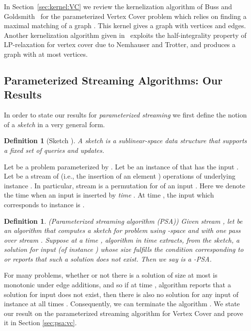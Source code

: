 \documentclass[11pt,letter]{article}
\newtheorem{definition}[theorem]{Definition}
\renewcommand{\paragraph}[1]{\medskip \noindent {\bf #1}}
\begin{document}
In Section~\ref{sec:kernel:VC} we review
the kernelization algorithm of Buss and Goldsmith~\cite{BG93} for the parameterized Vertex Cover problem
which relies on finding a maximal matching of a graph .
This kernel gives a graph with  vertices and  edges.
Another kernelization algorithm given in~\cite{FG06} exploits the half-integrality
property of LP-relaxation for vertex cover due to Nemhauser and Trotter,
and produces a graph with at most  vertices.




\subsection{Parameterized Streaming Algorithms: Our Results}

In order to state our results for \textit{parameterized streaming}
we first define the notion of a \textit{sketch}  in a very general form.


\begin{definition}[Sketch \cite{AMS99,FKSV02,I06JACM}]
\label{def:sketch}
A \it{sketch} is a sublinear-space data structure that supports
a fixed set of queries and updates.
\end{definition}




\paragraph{Insertion-Only Streaming.}
Let   be a problem parameterized by .
Let  be an instance of  that has the input
.
Let  be a stream of  (i.e., the insertion of an element )
operations of underlying instance .
In particular, stream  is a permutation
 for  of an input . Here we denote
the time when an input  is inserted by \textit{time} . At time ,
the input which corresponds to instance  is .



\begin{definition}({\sc Parameterized streaming algorithm (PSA)})
Given stream , let   be an algorithm  that computes a sketch for problem 
using -space
and with one pass over stream . Suppose at a time ,
algorithm  in time  extracts,  from the sketch,
a solution for input  (of instance ) whose  size fulfills
the condition corresponding to   or reports that such a solution does not exist.
Then we say  is a -PSA.
\label{defn:psa}
\end{definition}




For many problems, whether or not there is a solution of size at most
 is monotonic under edge additions, and so
if at time , algorithm  reports that a solution
for input  does not exist, then
there is also no solution for any input  of instance 
at all times .
Consequently, we can terminate the algorithm .
We state our result on the parameterized streaming
algorithm for Vertex Cover and prove it in Section \ref{sec:psa:vc}.
\end{document}
